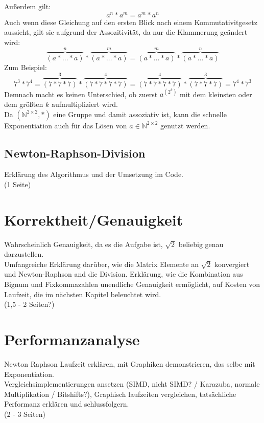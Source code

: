 \documentclass[course=erap]{aspdoc}
\begin{document}
Außerdem gilt:
\begin{equation}\label{swap_exponents}
      a^n*a^m = a^m*a^n
\end{equation}
Auch wenn diese Gleichung auf den ersten Blick nach einem Kommutativitgesetz aussieht, gilt sie aufgrund der Assozitivität, da nur die Klammerung geändert wird:
\[ \overbrace{(a*\dots*a)}^n*\overbrace{(a*\dots*a)}^m = \overbrace{(a*\dots*a)}^m*\overbrace{(a*\dots*a)}^n \]
Zum Beispiel:
\[ 7^3*7^4 = \overbrace{(7*7*7)}^3*\overbrace{(7*7*7*7)}^4 = \overbrace{(7*7*7*7)}^4*\overbrace{(7*7*7)}^3 = 7^4*7^3 \]
Demnach macht es keinen Unterschied, ob zuerst $a^{(2^k)}$ mit dem kleinsten oder dem größten $k$ aufmultipliziert wird.\\
Da $(\mathbb{N}^{2\times 2}, *)$ eine Gruppe und damit assoziativ ist, kann die schnelle Exponentiation auch für das Lösen von $a\in\mathbb{N}^{2\times 2}$ genutzt werden.
\subsection{Newton-Raphson-Division}
Erklärung des Algorithmus und der Umsetzung im Code. \\
(1 Seite)

\section{Korrektheit/Genauigkeit}
Wahrscheinlich Genauigkeit, da es die Aufgabe ist, $\sqrt{2}$ beliebig genau darzustellen. \\

Umfangreiche Erklärung darüber, wie die Matrix Elemente an $\sqrt{2}$ konvergiert und Newton-Raphson and die Division. Erklärung, wie die Kombination aus Bignum und Fixkommazahlen unendliche Genauigkeit 
ermöglicht, auf Kosten von Laufzeit, die im nächsten Kapitel beleuchtet wird. \\ 
(1,5 - 2 Seiten?)

\section{Performanzanalyse}
Newton Raphson Laufzeit erklären, mit Graphiken demonstrieren, das selbe mit Exponentiation. \\
Vergleichsimplementierungen ansetzen (SIMD, nicht SIMD? / Karazuba, normale Multiplikation / Bitshifts?), Graphisch laufzeiten vergleichen, tatsächliche Performanz erklären und schlussfolgern. \\
(2 - 3 Seiten)
\end{document}
